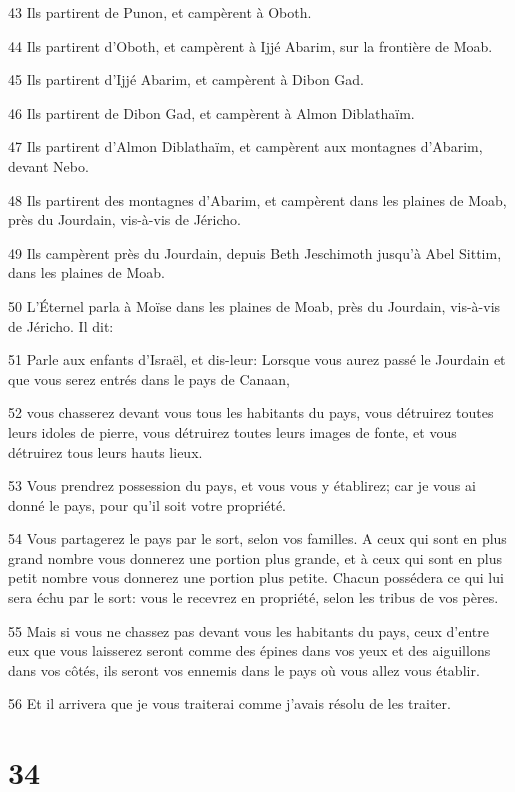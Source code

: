 \par 43 Ils partirent de Punon, et campèrent à Oboth.
\par 44 Ils partirent d'Oboth, et campèrent à Ijjé Abarim, sur la frontière de Moab.
\par 45 Ils partirent d'Ijjé Abarim, et campèrent à Dibon Gad.
\par 46 Ils partirent de Dibon Gad, et campèrent à Almon Diblathaïm.
\par 47 Ils partirent d'Almon Diblathaïm, et campèrent aux montagnes d'Abarim, devant Nebo.
\par 48 Ils partirent des montagnes d'Abarim, et campèrent dans les plaines de Moab, près du Jourdain, vis-à-vis de Jéricho.
\par 49 Ils campèrent près du Jourdain, depuis Beth Jeschimoth jusqu'à Abel Sittim, dans les plaines de Moab.
\par 50 L'Éternel parla à Moïse dans les plaines de Moab, près du Jourdain, vis-à-vis de Jéricho. Il dit:
\par 51 Parle aux enfants d'Israël, et dis-leur: Lorsque vous aurez passé le Jourdain et que vous serez entrés dans le pays de Canaan,
\par 52 vous chasserez devant vous tous les habitants du pays, vous détruirez toutes leurs idoles de pierre, vous détruirez toutes leurs images de fonte, et vous détruirez tous leurs hauts lieux.
\par 53 Vous prendrez possession du pays, et vous vous y établirez; car je vous ai donné le pays, pour qu'il soit votre propriété.
\par 54 Vous partagerez le pays par le sort, selon vos familles. A ceux qui sont en plus grand nombre vous donnerez une portion plus grande, et à ceux qui sont en plus petit nombre vous donnerez une portion plus petite. Chacun possédera ce qui lui sera échu par le sort: vous le recevrez en propriété, selon les tribus de vos pères.
\par 55 Mais si vous ne chassez pas devant vous les habitants du pays, ceux d'entre eux que vous laisserez seront comme des épines dans vos yeux et des aiguillons dans vos côtés, ils seront vos ennemis dans le pays où vous allez vous établir.
\par 56 Et il arrivera que je vous traiterai comme j'avais résolu de les traiter.

\chapter{34}

